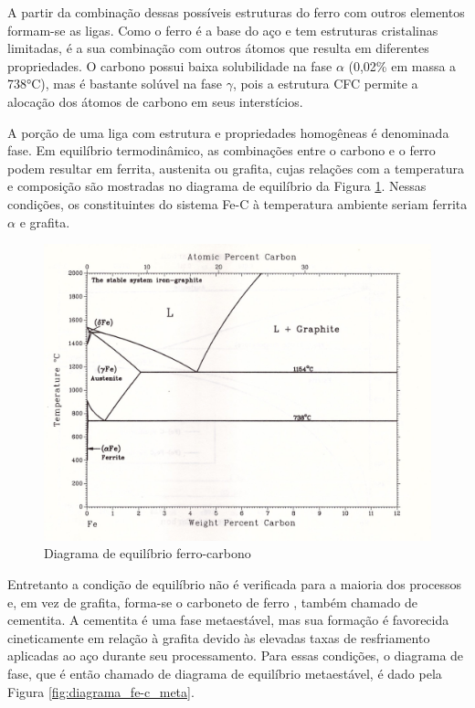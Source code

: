 \documentclass[brazil,tese,epusp]{usp}
\begin{document}
A partir da combinação dessas possíveis estruturas do ferro com outros elementos formam-se as ligas. Como o ferro é a base do aço e tem estruturas cristalinas limitadas, é a sua combinação com outros átomos que resulta em diferentes propriedades. O carbono possui baixa solubilidade na fase $\alpha$ (0,02\% em massa a 738°C), mas é bastante solúvel na fase $\gamma$, pois a estrutura CFC permite a alocação dos átomos de carbono em seus interstícios.

A porção de uma liga com estrutura e propriedades homogêneas é denominada fase. Em equilíbrio termodinâmico, as combinações entre o carbono e o ferro podem resultar em ferrita, austenita ou grafita, cujas relações com a temperatura e composição são mostradas no diagrama de equilíbrio da Figura \ref{fig:diagrama_fe-c}. Nessas condições, os constituintes do sistema Fe-C à temperatura ambiente seriam ferrita $\alpha$ e grafita.

\begin{figure}[ht!]
  \includegraphics[width=.8\textwidth,angle=180]{img/Fe-C.jpg}
  \caption{Diagrama de equilíbrio ferro-carbono \cite{Massalski1996v1}}
  \label{fig:diagrama_fe-c}
\end{figure}

Entretanto a condição de equilíbrio não é verificada para a maioria dos processos e, em vez de grafita, forma-se o carboneto de ferro , também chamado de cementita. A cementita é uma fase metaestável, mas sua formação é favorecida cineticamente em relação à grafita devido às elevadas taxas de resfriamento aplicadas ao aço durante seu processamento.
Para essas condições, o diagrama de fase, que é então chamado de diagrama de equilíbrio metaestável, é dado pela Figura \ref{fig:diagrama_fe-c_meta}.
\end{document}
